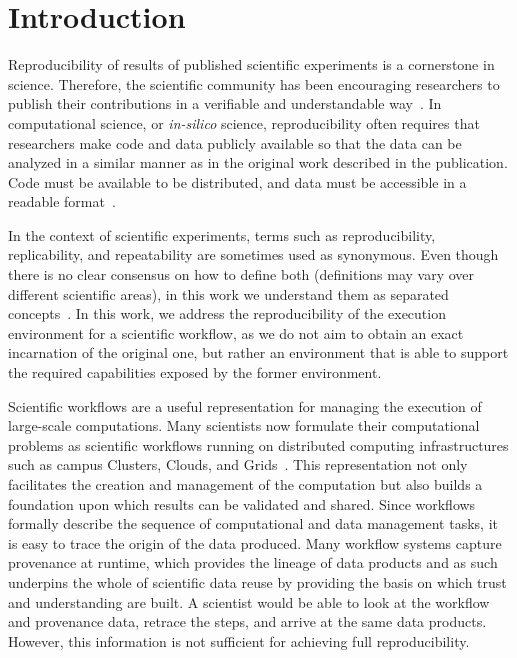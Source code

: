 \documentclass[final,5p,times,twocolumn]{elsarticle}
\begin{document}
\section{Introduction}

Reproducibility of results of published scientific experiments is a cornerstone in science. Therefore, the scientific community has been encouraging researchers to publish their contributions in a verifiable and understandable way~\cite{YaleRoundtable09}. 
In computational science, or \emph{in-silico} science, reproducibility often requires that researchers make code and data publicly available so that the data can be analyzed in a similar manner as in the original work described in the publication. Code must be available to be distributed, and data must be accessible in a readable format~\cite{bookReproducibility}. 

In the context of scientific experiments, terms such as reproducibility, replicability, and repeatability are sometimes used as synonymous. Even though there is no clear consensus on how to define both (definitions may vary over different scientific areas), in this work we understand them as separated concepts~\cite{Drummond2011}. In this work, we address the reproducibility of the execution environment for a scientific workflow, as we do not aim to obtain an exact incarnation of the original one, but rather an environment that is able to support the required capabilities exposed by the former environment.

Scientific workflows are a useful representation for managing the execution of large-scale computations. Many scientists now formulate their computational problems as scientific workflows running on distributed computing infrastructures such as campus Clusters, Clouds, and Grids~\cite{workflowBook}. This representation not only facilitates the creation and management of the computation but also builds a foundation upon which results can be validated and shared. Since workflows formally describe the sequence of computational and data management tasks, it is easy to trace the origin of the data produced. Many workflow systems capture provenance at runtime, which provides the lineage of data products and as such underpins the whole of scientific data reuse by providing the basis on which trust and understanding are built. A scientist would be able to look at the workflow and provenance data, retrace the steps, and arrive at the same data products. 
However, this information is not sufficient for achieving full reproducibility.
\end{document}
